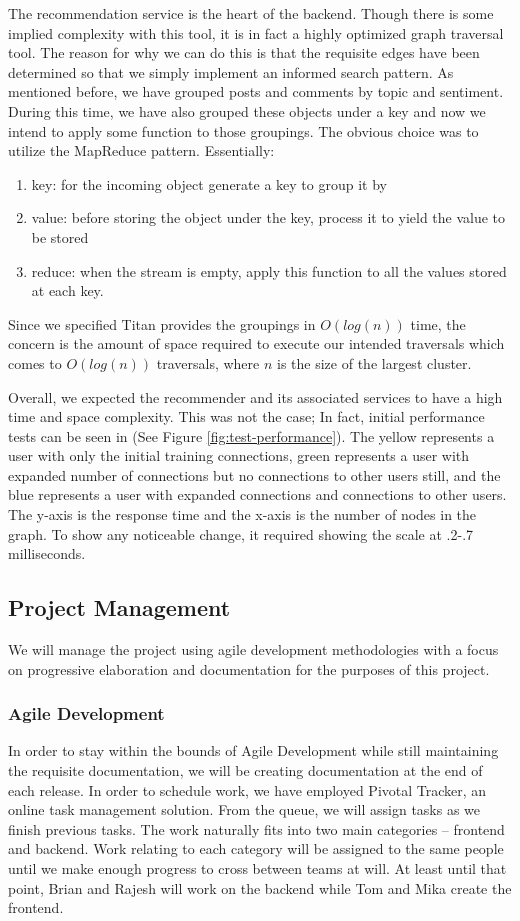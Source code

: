 \documentclass[11pt,letterpaper]{article}
\begin{document}
The recommendation service is the heart of the backend. Though there is some implied complexity with this tool, it is in fact a highly optimized graph traversal tool. The reason for why we can do this is that the requisite edges have been determined so that we simply implement an informed search pattern. As mentioned before, we have grouped posts and comments by topic and sentiment. During this time, we have also grouped these objects under a key and now we intend to apply some function to those groupings. The obvious choice was to utilize the MapReduce pattern. Essentially:
\begin{enumerate}
    \item key: for the incoming object generate a key to group it by
	\item value: before storing the object under the key, process it to yield the value to be stored
	\item reduce: when the stream is empty, apply this function to all the values stored at each key.
\end{enumerate} 
Since we specified Titan provides the groupings in $O(log(n))$ time, the concern is the amount of space required to execute our intended traversals which comes to $O(log(n))$ traversals, where $n$ is the size of the largest cluster.

Overall, we expected the recommender and its associated services to have a high time and space complexity. This was not the case; In fact, initial performance tests can be seen in (See Figure \ref{fig:test-performance}). The yellow represents a user with only the initial training connections, green represents a user with expanded number of connections but no connections to other users still, and the blue represents a user with expanded connections and connections to other users. The y-axis is the response time and the x-axis is the number of nodes in the graph. To show any noticeable change, it required showing the scale at .2-.7 milliseconds. 

\subsection{Project Management}
We will manage the project using agile development methodologies with a focus on progressive elaboration and documentation for the purposes of this project.

\subsubsection{Agile Development}
In order to stay within the bounds of Agile Development while still maintaining the requisite documentation, we will be creating documentation at the end of each release.
In order to schedule work, we have employed Pivotal Tracker, an online task management solution.
From the queue, we will assign tasks as we finish previous tasks.
The work naturally fits into two main categories -- frontend and backend.
Work relating to each category will be assigned to the same people until we make enough progress to cross between teams at will.
At least until that point, Brian and Rajesh will work on the backend while Tom and Mika create the frontend.
\end{document}
